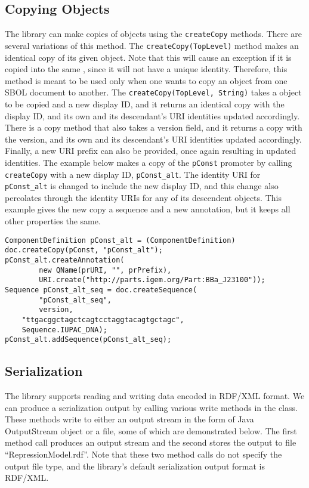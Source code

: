 \subsection*{Copying Objects}
The library can make copies of  objects using the \lstinline+createCopy+ methods.  There are several variations of this method. The \lstinline+createCopy(TopLevel)+ method makes an identical copy of its given  object. Note that this will cause an exception if it is copied into the same , since it will not have a unique identity. Therefore, this method is meant to be used only when one wants to copy an object from one SBOL document to another. The \lstinline+createCopy(TopLevel, String)+ takes a  object to be copied and a new display ID, and it returns an identical copy with the display ID, and its own and its descendant's URI identities updated accordingly. There is a copy method that also takes a version field, and it returns a copy with the version, and its own and its descendant's URI identities updated accordingly.  Finally, a new URI prefix can also be provided, once again resulting in updated identities. The example below makes a copy of the
\lstinline+pConst+ promoter by calling \lstinline+createCopy+ with a new display ID, \lstinline+pConst_alt+. The identity URI for \lstinline+pConst_alt+ is changed to include the new display ID, and this change also percolates through the identity URIs for any of its descendent objects.  This example gives the new copy a sequence and a new annotation, but it keeps all other properties the same. 

\vspace{\abovedisplayskip}
\begin{minipage}{0.95\textwidth} 
\begin{lstlisting}
ComponentDefinition pConst_alt = (ComponentDefinition) doc.createCopy(pConst, "pConst_alt");
pConst_alt.createAnnotation(
        new QName(prURI, "", prPrefix),
        URI.create("http://parts.igem.org/Part:BBa_J23100"));
Sequence pConst_alt_seq = doc.createSequence(
        "pConst_alt_seq", 
        version, 
	"ttgacggctagctcagtcctaggtacagtgctagc",
	Sequence.IUPAC_DNA); 
pConst_alt.addSequence(pConst_alt_seq);
\end{lstlisting}
\end{minipage}

\subsection*{Serialization}
The library supports reading and writing data encoded in RDF/XML
format. We can produce a serialization output by
calling various write methods in the 
class. These methods write to either an output stream in the form of
Java OutputStream object or a file, some
of which are demonstrated below. The first method call produces an output
stream and the second stores the output to file
``RepressionModel.rdf''. Note that these two method calls do not
specify the output file type, and the library's default serialization
output format is RDF/XML.

